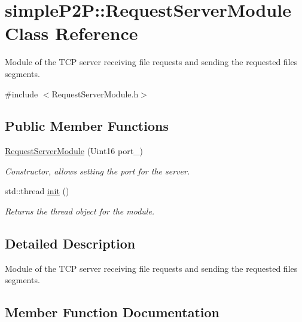 \hypertarget{classsimpleP2P_1_1RequestServerModule}{}\section{simple\+P2P\+:\+:Request\+Server\+Module Class Reference}
\label{classsimpleP2P_1_1RequestServerModule}


Module of the T\+CP server receiving file requests and sending the requested files\textquotesingle{} segments.  




{\ttfamily \#include $<$Request\+Server\+Module.\+h$>$}

\subsection*{Public Member Functions}
\begin{DoxyCompactItemize}
\item 
\mbox{\label{classsimpleP2P_1_1RequestServerModule_ac3797b7b7dcebf58cdd71aaf73d401cc}} 
\hyperlink{classsimpleP2P_1_1RequestServerModule_ac3797b7b7dcebf58cdd71aaf73d401cc}{Request\+Server\+Module} (Uint16 port\+\_\+)
\begin{DoxyCompactList}\small\item\em Constructor, allows setting the port for the server. \end{DoxyCompactList}\item 
std\+::thread \hyperlink{classsimpleP2P_1_1RequestServerModule_a3ab4c254bd55ff9800156118e1ff472e}{init} ()
\begin{DoxyCompactList}\small\item\em Returns the thread object for the module. \end{DoxyCompactList}\end{DoxyCompactItemize}


\subsection{Detailed Description}
Module of the T\+CP server receiving file requests and sending the requested files\textquotesingle{} segments. 

\subsection{Member Function Documentation}
\mbox{\label{classsimpleP2P_1_1RequestServerModule_a3ab4c254bd55ff9800156118e1ff472e}} 
